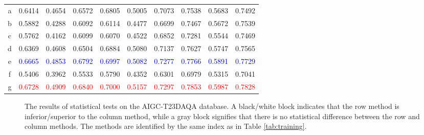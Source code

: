 \begin{table*}[tbph]
{\begin{tabular}{c|rrr|rrr|rrr}
a & 0.6414 & 0.4654 & 0.6572 & 0.6805 & 0.5005 & 0.7073 & 0.7538 & 0.5683 & 0.7492 \\
b & 0.5882 & 0.4288 & 0.6092 & 0.6114 & 0.4477 & 0.6699 & 0.7467 & 0.5672 & 0.7539 \\
c & 0.5762 & 0.4162 & 0.6099 & 0.6070 & 0.4522 & 0.6852 & 0.7281 & 0.5544 & 0.7469 \\
d & 0.6369 & 0.4608 & 0.6504 & 0.6884 & 0.5080 & 0.7137 & 0.7627 & 0.5747 & 0.7565 \\
e & \textcolor{blue}{0.6665} & \textcolor{blue}{0.4853} & \textcolor{blue}{0.6792} & \textcolor{blue}{0.6997} & \textcolor{blue}{0.5082} & \textcolor{blue}{0.7277} & \textcolor{blue}{0.7766} & \textcolor{blue}{0.5891} & \textcolor{blue}{0.7729} \\
f & 0.5406 & 0.3962 & 0.5533 & 0.5790 & 0.4352 & 0.6301 & 0.6979 & 0.5315 & 0.7041 \\
g & \textcolor{red}{0.6728} & \textcolor{red}{0.4909} & \textcolor{red}{0.6840} & \textcolor{red}{0.7000} & \textcolor{red}{0.5157} & \textcolor{red}{0.7297} & \textcolor{red}{0.7853} & \textcolor{red}{0.5987} & \textcolor{red}{0.7828} \\
\bottomrule
\end{tabular}
}
\vspace{-0.5cm}
\end{table*}


\begin{figure*}[ht]
    \centering

                            
    \caption{The results of statistical tests on the AIGC-T23DAQA database. A black/white block indicates that the row method is inferior/superior to the column method, while a gray block signifies that there is no statistical difference between the row and column methods. The methods are identified by the same index as in Table \ref{tab:training}. }
    \label{fig:compare}
    \vspace{-0.5cm}
\end{figure*}
\vspace{-15pt}
